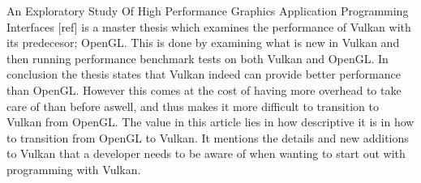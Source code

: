 \begin{sectionmeta}
An Exploratory Study Of High Performance Graphics Application Programming Interfaces [ref] is a master thesis which examines the performance of Vulkan with its predecesor; OpenGL. 
This is done by examining what is new in Vulkan and then running performance benchmark tests on both Vulkan and OpenGL.
In conclusion the thesis states that Vulkan indeed can provide better performance than OpenGL.
However this comes at the cost of having more overhead to take care of than before aswell, and thus makes it more difficult to transition to Vulkan from OpenGL.
The value in this article lies in how descriptive it is in how to transition from OpenGL to Vulkan. 
It mentions the details and new additions to Vulkan that a developer needs to be aware of when wanting to start out with programming with Vulkan.

\end{sectionmeta}